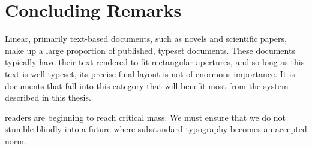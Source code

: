 \section{Concluding Remarks}

Linear, primarily text-based documents, such as novels and scientific papers, make up a large proportion of published, typeset documents. These documents typically have their text rendered to fit rectangular apertures, and so long as this text is well-typeset, its precise final layout is not of enormous importance. It is documents that fall into this category that will benefit most from the system described in this thesis.

\vspace{0.4in}

\noindent
\Ebook{} readers are beginning to reach critical mass. We must ensure that we do not stumble blindly into a future where substandard typography becomes an accepted norm.


